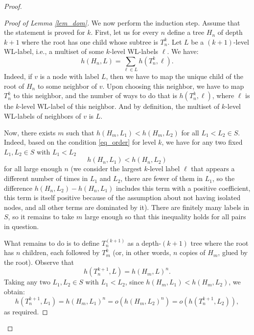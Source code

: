 \documentclass[10pt,a4paper]{amsart}
\begin{document}
\begin{proof}
\begin{proof}[Proof of Lemma \ref{lem_dom}]
We now perform the induction step. Assume that the statement is proved for $k$. First, let us for every $n$ define a tree $H_n$ of depth $k + 1$  where the root has one child whose subtree is $T_n^k$. Let $L$ be a $(k + 1)$-level WL-label, i.e., a multiset of some $k$-level WL-labels $\ell$. We have:
\[h(H_n, L) =  \sum\limits_{\ell\in L} h(T_n^k, \ell).\]
Indeed, if $v$ is a node with label $L$, then we have to map the unique child of the root of $H_n$ to some neighbor of $v$. Upon choosing this neighbor, we have to map $T_n^k$ to this neighbor, and the number of ways to do that is $h(T_n^k, \ell)$, where $\ell$ is the $k$-level WL-label of this neighbor. And by definition, the multiset of $k$-level WL-labels of neighbors of $v$ is $L$. 


 Now, there exists $m$ such that $h(H_m, L_1) < h(H_m, L_2)$ for all $L_1 < L_2 \in S$. Indeed, based on the condition \eqref{eq_order} for level $k$, we have for any two fixed $L_1, L_2 \in S$ with $L_1 < L_2$ 
 \[h(H_n, L_1) < h(H_n, L_2)\]
 for all large enough $n$ (we consider the largest $k$-level label $\ell$ that appears a different number of times in $L_1$ and $L_2$, there are fewer of them in $L_1$, so the difference  $h(H_n, L_2) - h(H_n, L_1)$ includes this term with a positive coefficient, this term is itself positive because of the assumption about not having isolated nodes, and all other terms are dominated by it). There are finitely many labels in $S$, so it remains to take $m$ large enough so that this inequality holds for all pairs in question.


 What remains to do is to define $T_n^{(k+1)}$ as a depth-$(k+1)$ tree where the root has $n$ children, each followed by $T_m^k$ (or, in other words, $n$ copies of $H_m$, glued by the root). Observe that 
 \[h(T_n^{k+1}, L) = h(H_m, L)^n.\]
Taking any two $L_1, L_2 \in S$ with $L_1 < L_2$, since  $h(H_m, L_1) < h(H_m, L_2)$, we obtain:
\[h(T_n^{k+1}, L_1) = h(H_m, L_1)^n = o( h(H_m, L_2)^n) = o(h(T_n^{k+1}, L_2)),\]
as required.
    \end{proof}
\end{proof}
\end{document}

